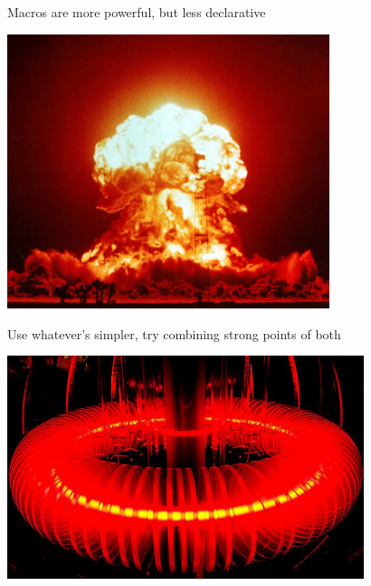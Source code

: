 \documentclass[compress,xcolor={usenames,dvipsnames,table}]{beamer}
\begin{document}
\begin{frame}[fragile]{Macros are more powerful, but less declarative}
  \begin{center}
    \includegraphics[height=8cm]{img/boom.jpg}
  \end{center}
\end{frame}

\begin{frame}[fragile]{Use whatever's simpler, try combining strong points of both}
  \begin{center}
    \includegraphics[height=6.5cm]{img/fusion.jpg}
  \end{center}
\end{frame}
\end{document}
